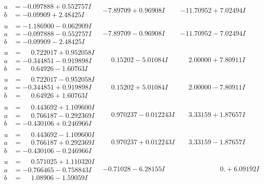 \documentclass[1p]{elsarticle_modified}
\theoremstyle{definition}
\begin{document}
$$\begin{array}{c|c|c}
\begin{aligned}
a &= -0.097888 + 0.552757 I \\
b &= -0.09909 + 2.48425 I\end{aligned}
 & -7.89709 + 0.96908 I & -11.70952 + 7.02494 I \\ \hline\begin{aligned}
u &= -1.186900 - 0.062909 I \\
a &= -0.097888 - 0.552757 I \\
b &= -0.09909 - 2.48425 I\end{aligned}
 & -7.89709 - 0.96908 I & -11.70952 - 7.02494 I \\ \hline\begin{aligned}
u &= \phantom{-}0.722017 + 0.952058 I \\
a &= -0.344851 - 0.919898 I \\
b &= \phantom{-}0.64926 - 1.60763 I\end{aligned}
 & \phantom{-}0.15202 - 5.01084 I & \phantom{-}2.00000 + 7.80911 I \\ \hline\begin{aligned}
u &= \phantom{-}0.722017 - 0.952058 I \\
a &= -0.344851 + 0.919898 I \\
b &= \phantom{-}0.64926 + 1.60763 I\end{aligned}
 & \phantom{-}0.15202 + 5.01084 I & \phantom{-}2.00000 - 7.80911 I \\ \hline\begin{aligned}
u &= \phantom{-}0.443692 + 1.109600 I \\
a &= \phantom{-}0.766187 - 0.292369 I \\
b &= -0.430106 + 0.246966 I\end{aligned}
 & \phantom{-}0.970237 - 0.012243 I & \phantom{-}3.33159 + 1.87657 I \\ \hline\begin{aligned}
u &= \phantom{-}0.443692 - 1.109600 I \\
a &= \phantom{-}0.766187 + 0.292369 I \\
b &= -0.430106 - 0.246966 I\end{aligned}
 & \phantom{-}0.970237 + 0.012243 I & \phantom{-}3.33159 - 1.87657 I \\ \hline\begin{aligned}
u &= \phantom{-}0.571025 + 1.110320 I \\
a &= -0.766465 - 0.758843 I \\
b &= \phantom{-}1.08906 - 1.59059 I\end{aligned}
 & -0.71028 - 6.28155 I & \phantom{-0.000000 -}0. + 6.09192 I \\ \hline\begin{aligned}

\end{aligned}
\end{array}$$
\end{document}
